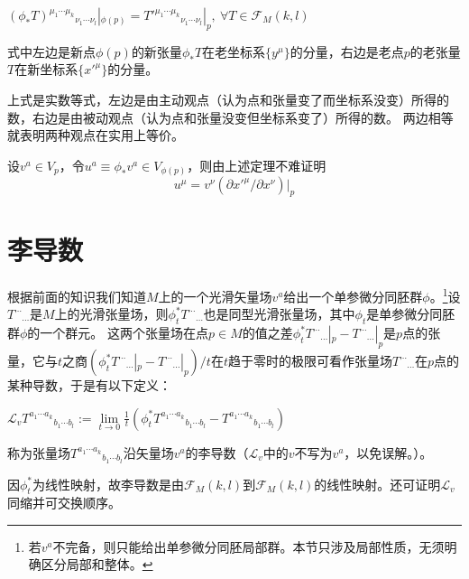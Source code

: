 \begin{theorem}
$(\phi_*T)^{\mu_1 \cdots \mu_k}{}_{\nu_1 \cdots \nu_l}|_{\phi(p)} = T'^{\mu_1 \cdots \mu_k}{}_{\nu_1 \cdots \nu_l}|_p, ~ \forall T \in \mathscr{F}_M(k, l)$

式中左边是新点$\phi(p)$的新张量$\phi_*T$在老坐标系$\{y^\mu\}$的分量，右边是老点$p$的老张量$T$在新坐标系$\{x'^\mu\}$的分量。
\end{theorem}

\begin{note}
上式是实数等式，左边是由主动观点（认为点和张量变了而坐标系没变）所得的数，右边是由被动观点（认为点和张量没变但坐标系变了）所得的数。
两边相等就表明两种观点在实用上等价。
\end{note}

\begin{example}
设$v^a \in V_p$，令$u^a \equiv \phi_*v^a \in V_{\phi(p)}$，则由上述定理不难证明
$$u^\mu = v^\nu(\partial x'^\mu / \partial x^\nu)|_p$$
\end{example}

\section{李导数}

根据前面的知识我们知道$M$上的一个光滑矢量场$v^a$给出一个单参微分同胚群$\phi$。\footnote{
若$v^a$不完备，则只能给出单参微分同胚局部群。本节只涉及局部性质，无须明确区分局部和整体。
}设$T^{\cdots}{}_{\cdots}$是$M$上的光滑张量场，则$\phi^*_tT^{\cdots}{}_{\cdots}$也是同型光滑张量场，其中$\phi_t$是单参微分同胚群$\phi$的一个群元。
这两个张量场在点$p \in M$的值之差$\phi^*_tT^{\cdots}{}_{\cdots}|_p - T^{\cdots}{}_{\cdots}|_p$是$p$点的张量，它与$t$之商$(\phi^*_tT^{\cdots}{}_{\cdots}|_p - T^{\cdots}{}_{\cdots}|_p) / t$在$t$趋于零时的极限可看作张量场$T^{\cdots}{}_{\cdots}$在$p$点的某种导数，于是有以下定义：

\begin{definition}
$\mathscr{L}_vT^{a_1 \cdots a_k}{}_{b_1 \cdots b_l} := \lim\limits_{t \to 0}\frac{1}{t}(\phi^*_tT^{a_1 \cdots a_k}{}_{b_1 \cdots b_l} - T^{a_1 \cdots a_k}{}_{b_1 \cdots b_l})$

称为张量场$T^{a_1 \cdots a_k}{}_{b_1 \cdots b_l}$沿矢量场$v^a$的李导数（$\mathscr{L}_v$中的$v$不写为$v^a$，以免误解。）。
\end{definition}

\begin{note}
因$\phi^*_t$为线性映射，故李导数是由$\mathscr{F}_M(k, l)$到$\mathscr{F}_M(k, l)$的线性映射。还可证明$\mathscr{L}_v$同缩并可交换顺序。
\end{note}

